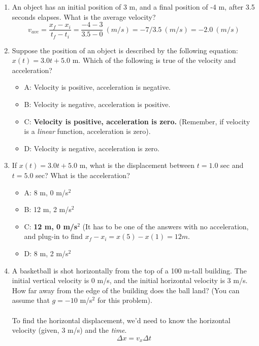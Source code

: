 \documentclass[10pt]{article}
\begin{document}
\begin{enumerate}
\item An object has an initial position of 3 m, and a final position of -4 m, after 3.5 seconds elapses.  What is the average velocity? \\ 
\begin{equation}
v_{ave} = \frac{x_f-x_i}{t_f - t_i} = \frac{-4 - 3}{3.5 - 0} ~ (m/s) = -7/3.5 ~ (m/s) = -2.0 ~ (m/s)
\end{equation}
\item Suppose the position of an object is described by the following equation: $x(t) = 3.0 t + 5.0$ m.  Which of the following is true of the velocity and acceleration?
\begin{itemize}
\item A: Velocity is positive, acceleration is negative.
\item B: Velocity is negative, acceleration is positive.
\item C: \textbf{Velocity is positive, acceleration is zero.} (Remember, if velocity is a \textit{linear} function, acceleration is zero).
\item D: Velocity is negative, acceleration is zero.
\end{itemize}
\item If $x(t) = 3.0 t + 5.0$ m, what is the displacement between $t=1.0$ sec and $t=5.0$ sec? What is the acceleration?
\begin{itemize}
\item A: 8 m, 0 m/s$^2$
\item B: 12 m, 2 m/s$^2$
\item C: \textbf{12 m, 0 m/s$^2$} (It has to be one of the answers with no acceleration, and plug-in to find $x_f - x_i = x(5) - x(1) = 12 m$.
\item D: 8 m, 2 m/s$^2$
\end{itemize}
\item A basketball is shot horizontally from the top of a 100 m-tall building.  The initial vertical velocity is 0 m/s, and the initial horizontal velocity is 3 m/s.  How far away from the edge of the building does the ball land?  (You can assume that $g = -10$ m/s$^2$ for this problem). \\ \\
To find the horizontal displacement, we'd need to know the horizontal velocity (given, 3 m/s) and the \textit{time}.
\begin{equation}
\Delta x = v_x \Delta t \label{eq:1}
\end{equation}

\end{enumerate}
\end{document}
